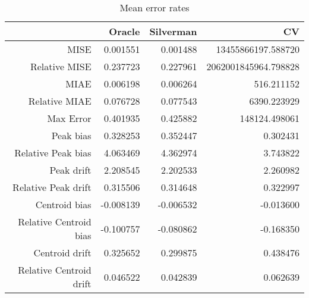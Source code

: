 \begin{table}[ht]
\centering
\begin{tabular}{rrrr}
  \hline
 & Oracle & Silverman & CV \\ 
  \hline
MISE & 0.001551 & 0.001488 & 13455866197.588720 \\ 
  Relative MISE & 0.237723 & 0.227961 & 2062001845964.798828 \\ 
  MIAE & 0.006198 & 0.006264 & 516.211152 \\ 
  Relative MIAE & 0.076728 & 0.077543 & 6390.223929 \\ 
  Max Error & 0.401935 & 0.425882 & 148124.498061 \\ 
  Peak bias & 0.328253 & 0.352447 & 0.302431 \\ 
  Relative Peak bias & 4.063469 & 4.362974 & 3.743822 \\ 
  Peak drift & 2.208545 & 2.202533 & 2.260982 \\ 
  Relative Peak drift & 0.315506 & 0.314648 & 0.322997 \\ 
  Centroid bias & -0.008139 & -0.006532 & -0.013600 \\ 
  Relative Centroid bias & -0.100757 & -0.080862 & -0.168350 \\ 
  Centroid drift & 0.325652 & 0.299875 & 0.438476 \\ 
  Relative Centroid drift & 0.046522 & 0.042839 & 0.062639 \\ 
   \hline
\end{tabular}
\caption{Mean error rates} 
\label{tbl:mean_error_rates}
\end{table}

